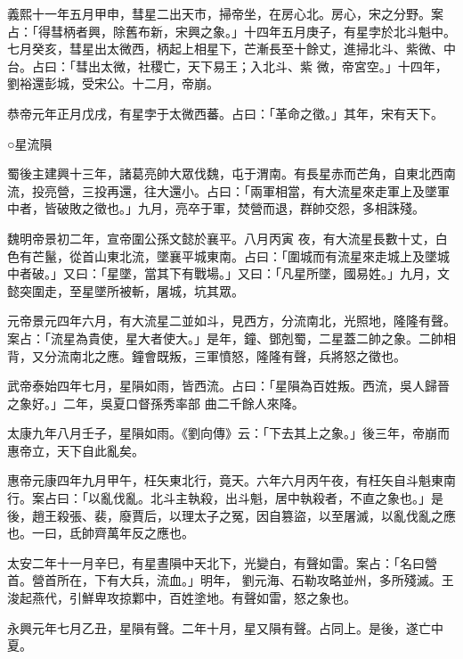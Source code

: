 \begin{pinyinscope}
 義熙十一年五月甲申，彗星二出天市，掃帝坐，在房心北。房心，宋之分野。案占：「得彗柄者興，除舊布新，宋興之象。」十四年五月庚子，有星孛於北斗魁中。七月癸亥，彗星出太微西，柄起上相星下，芒漸長至十餘丈，進掃北斗、紫微、中台。占曰：「彗出太微，社稷亡，天下易王；入北斗、紫
 微，帝宮空。」十四年，劉裕還彭城，受宋公。十二月，帝崩。



 恭帝元年正月戊戌，有星孛于太微西蕃。占曰：「革命之徵。」其年，宋有天下。



 ○星流隕



 蜀後主建興十三年，諸葛亮帥大眾伐魏，屯于渭南。有長星赤而芒角，自東北西南流，投亮營，三投再還，往大還小。占曰：「兩軍相當，有大流星來走軍上及墜軍中者，皆破敗之徵也。」九月，亮卒于軍，焚營而退，群帥交怨，多相誅殘。



 魏明帝景初二年，宣帝圍公孫文懿於襄平。八月丙寅
 夜，有大流星長數十丈，白色有芒鬣，從首山東北流，墜襄平城東南。占曰：「圍城而有流星來走城上及墜城中者破。」又曰：「星墜，當其下有戰場。」又曰：「凡星所墜，國易姓。」九月，文懿突圍走，至星墜所被斬，屠城，坑其眾。



 元帝景元四年六月，有大流星二並如斗，見西方，分流南北，光照地，隆隆有聲。案占：「流星為貴使，星大者使大。」是年，鐘、鄧剋蜀，二星蓋二帥之象。二帥相背，又分流南北之應。鐘會既叛，三軍憤怒，隆隆有聲，兵將怒之徵也。



 武帝泰始四年七月，星隕如雨，皆西流。占曰：「星隕為百姓叛。西流，吳人歸晉之象好。」二年，吳夏口督孫秀率部
 曲二千餘人來降。



 太康九年八月壬子，星隕如雨。《劉向傳》云：「下去其上之象。」後三年，帝崩而惠帝立，天下自此亂矣。



 惠帝元康四年九月甲午，枉矢東北行，竟天。六年六月丙午夜，有枉矢自斗魁東南行。案占曰：「以亂伐亂。北斗主執殺，出斗魁，居中執殺者，不直之象也。」是後，趙王殺張、裴，廢賈后，以理太子之冤，因自篡盜，以至屠滅，以亂伐亂之應也。一曰，氐帥齊萬年反之應也。



 太安二年十一月辛巳，有星晝隕中天北下，光變白，有聲如雷。案占：「名曰營首。營首所在，下有大兵，流血。」明年，
 劉元海、石勒攻略並州，多所殘滅。王浚起燕代，引鮮卑攻掠鄴中，百姓塗地。有聲如雷，怒之象也。



 永興元年七月乙丑，星隕有聲。二年十月，星又隕有聲。占同上。是後，遂亡中夏。




\end{pinyinscope}
